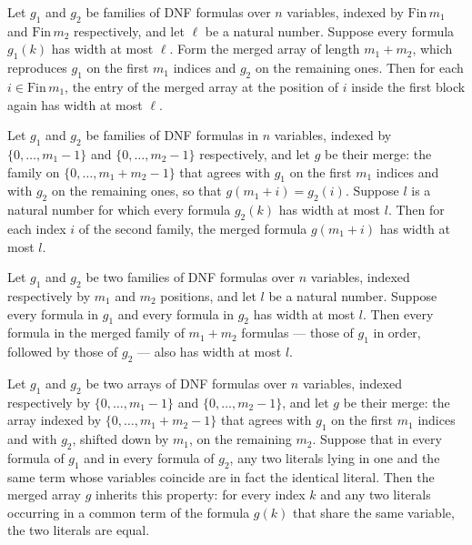 \begin{lemma}
\label{LMN.mergeGates_width_left}
\leanok
{}
Let $g_1$ and $g_2$ be families of DNF formulas over $n$ variables, indexed by
$\mathrm{Fin}\,m_1$ and $\mathrm{Fin}\,m_2$ respectively, and let $\ell$ be a natural
number. Suppose every formula $g_1(k)$ has width at most $\ell$. Form the merged array
of length $m_1+m_2$, which reproduces $g_1$ on the first $m_1$ indices and $g_2$ on the
remaining ones. Then for each $i \in \mathrm{Fin}\,m_1$, the entry of the merged array
at the position of $i$ inside the first block again has width at most $\ell$.
\end{lemma}

\begin{lemma}
\label{LMN.mergeGates_width_right}
\leanok
{}
Let $g_1$ and $g_2$ be families of DNF formulas in $n$ variables, indexed by
$\{0,\dots,m_1-1\}$ and $\{0,\dots,m_2-1\}$ respectively, and let $g$ be their merge:
the family on $\{0,\dots,m_1+m_2-1\}$ that agrees with $g_1$ on the first $m_1$ indices
and with $g_2$ on the remaining ones, so that $g(m_1+i)=g_2(i)$. Suppose $l$ is a
natural number for which every formula $g_2(k)$ has width at most $l$. Then for each
index $i$ of the second family, the merged formula $g(m_1+i)$ has width at most $l$.
\end{lemma}

\begin{lemma}
\label{LMN.mergeGates_width}
\leanok
{}
Let $g_1$ and $g_2$ be two families of DNF formulas over $n$ variables, indexed
respectively by $m_1$ and $m_2$ positions, and let $l$ be a natural number. Suppose
every formula in $g_1$ and every formula in $g_2$ has width at most $l$. Then every
formula in the merged family of $m_1 + m_2$ formulas — those of $g_1$ in order, followed
by those of $g_2$ — also has width at most $l$.
\end{lemma}

\begin{lemma}
\label{LMN.mergeGates_varInj}
\leanok
{}
Let $g_1$ and $g_2$ be two arrays of DNF formulas over $n$ variables, indexed
respectively by $\{0,\dots,m_1-1\}$ and $\{0,\dots,m_2-1\}$, and let $g$ be their merge:
the array indexed by $\{0,\dots,m_1+m_2-1\}$ that agrees with $g_1$ on the first $m_1$
indices and with $g_2$, shifted down by $m_1$, on the remaining $m_2$. Suppose that in
every formula of $g_1$ and in every formula of $g_2$, any two literals lying in one and
the same term whose variables coincide are in fact the identical literal. Then the
merged array $g$ inherits this property: for every index $k$ and any two literals
occurring in a common term of the formula $g(k)$ that share the same variable, the two
literals are equal.
\end{lemma}

